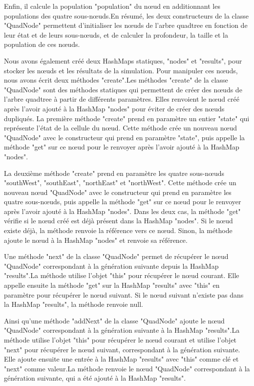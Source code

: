 Enfin, il calcule la population "population" du nœud en additionnant les populations des quatre sous-nœuds.En résumé, les deux constructeurs de la classe "QuadNode" permettent d'initialiser les nœuds de l'arbre quadtree en fonction de leur état et de leurs sous-nœuds, et de calculer la profondeur, la taille et la population de ces nœuds.\newline

Nous avons également créé deux HashMaps statiques, "nodes" et "results", pour stocker les nœuds et les résultats de la simulation. Pour manipuler ces nœuds, nous avons écrit deux méthodes "create".Les méthodes "create" de la classe "QuadNode" sont des méthodes statiques qui permettent de créer des nœuds de l'arbre quadtree à partir de différents paramètres. Elles renvoient le nœud créé après l'avoir ajouté à la HashMap "nodes" pour éviter de créer des nœuds dupliqués.\newline
La première méthode "create" prend en paramètre un entier "state" qui représente l'état de la cellule du nœud. Cette méthode crée un nouveau nœud "QuadNode" avec le constructeur qui prend en paramètre "state", puis appelle la méthode "get" sur ce nœud pour le renvoyer après l'avoir ajouté à la HashMap "nodes".\newline

La deuxième méthode "create" prend en paramètre les quatre sous-nœuds "southWest", "southEast", "northEast" et "northWest". Cette méthode crée un nouveau nœud "QuadNode" avec le constructeur qui prend en paramètre les quatre sous-nœuds, puis appelle la méthode "get" sur ce nœud pour le renvoyer après l'avoir ajouté à la HashMap "nodes".\newline
Dans les deux cas, la méthode "get" vérifie si le nœud créé est déjà présent dans la HashMap "nodes". Si le nœud existe déjà, la méthode renvoie la référence vers ce nœud. Sinon, la méthode ajoute le nœud à la HashMap "nodes" et renvoie sa référence.\newline

Une méthode "next" de la classe "QuadNode" permet de récupérer le nœud "QuadNode" correspondant à la génération suivante depuis la HashMap "results".La méthode utilise l'objet "this" pour récupérer le nœud courant. Elle appelle ensuite la méthode "get" sur la HashMap "results" avec "this" en paramètre pour récupérer le nœud suivant. Si le nœud suivant n'existe pas dans la HashMap "results", la méthode renvoie null.\newline

Ainsi qu'une méthode "addNext" de la classe "QuadNode" ajoute le nœud "QuadNode" correspondant à la génération suivante à la HashMap "results".La méthode utilise l'objet "this" pour récupérer le nœud courant et utilise l'objet "next" pour récupérer le nœud suivant, correspondant à la génération suivante. Elle ajoute ensuite une entrée à la HashMap "results" avec "this" comme clé et "next" comme valeur.La méthode renvoie le nœud "QuadNode" correspondant à la génération suivante, qui a été ajouté à la HashMap "results".\newline


